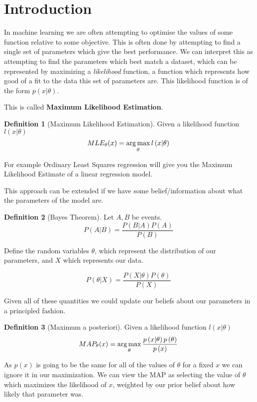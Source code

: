 \documentclass[12pt, a4paper]{report}
\theoremstyle{definition}
\theoremstyle{definition}
\newtheorem{definition}{Definition}[section]
\theoremstyle{definition}
\begin{document}
\section{Introduction}

In machine learning we are often attempting to optimise the values of some function relative to some objective. This is often done by attempting to find a single set of parameters which give the best performance. We can interpret this as attempting to find the parameters which best match a dataset, which can be represented by maximizing a \textit{likelihood} function, a function which represents how good of a fit to the data this set of parameters are. This likelihood function is of the form $p(x | \theta)$.


This is called \textbf{Maximum Likelihood Estimation}.

\begin{definition}[Maximum Likelihood Estimation]
    Given a likelihood function $l(x | \theta)$
$$MLE_{\theta}(x) = \operatorname*{arg\,max}_{\theta} l\left(x | \theta\right)$$
\end{definition}

For example Ordinary Least Squares regression will give you the Maximum Likelihood Estimate of a linear regression model.

This approach can be extended if we have some belief/information about what the parameters of the model are.

\begin{definition}[Bayes Theorem]
    Let $A,B$ be events.
$$P \left( A | B\right) = \frac{P \left( B | A\right) P \left(A\right)}{P \left(B \right)}$$
\end{definition}


Define the random variables $\theta$, which represent the distribution of our parameters, and $X$ which represents our data.

$$P \left( \theta | X\right) = \frac{P \left( X | \theta \right) P \left( \theta\right)}{P \left( X  \right)}$$

Given all of these quantities we could update our beliefs about our parameters in a principled fashion.


\begin{definition}[Maximum a posteriori]
    Given a likelihood function $l(x | \theta)$
$$MAP_{\theta}(x) = \operatorname*{arg\,max}_{\theta}  \frac{p \left( x | \theta \right) p \left( \theta\right)}{p \left( x  \right)}$$
\end{definition}

As $p(x)$ is going to be the same for all of the values of $\theta$ for a fixed $x$ we can ignore it in our maximization. We can view the MAP as selecting the value of $\theta$ which maximizes the likelihood of $x$, weighted by our prior belief about how likely that parameter was.
\end{document}
